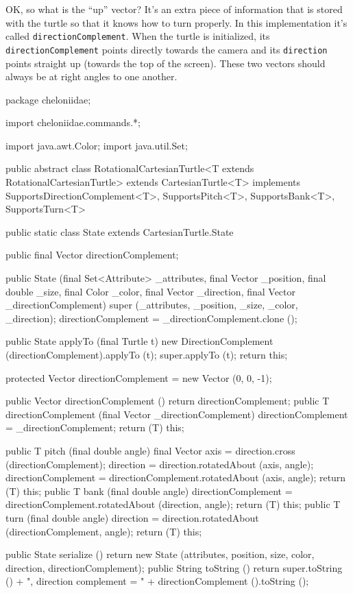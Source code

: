 \documentclass{report}
\begin{document}
      OK, so what is the ``up'' vector? It's an extra piece of information that is stored with the turtle so that it knows how to turn properly. In this
      implementation it's called {\tt directionComplement}. When the turtle is initialized, its {\tt directionComplement} points directly towards the camera and
      its {\tt direction} points straight up (towards the top of the screen). These two vectors should always be at right angles to one another.

\begin{javacode}
package cheloniidae;

import cheloniidae.commands.*;

import java.awt.Color;
import java.util.Set;

public abstract class RotationalCartesianTurtle<T extends RotationalCartesianTurtle> extends CartesianTurtle<T>
implements SupportsDirectionComplement<T>, SupportsPitch<T>, SupportsBank<T>, SupportsTurn<T> {

  public static class State extends CartesianTurtle.State {
    public final Vector directionComplement;

    public State (final Set<Attribute> _attributes, final Vector _position, final double _size, final Color _color,
                  final Vector _direction, final Vector _directionComplement) {
      super (_attributes, _position, _size, _color, _direction);
      directionComplement = _directionComplement.clone ();
    }

    public State applyTo (final Turtle t) {
      new DirectionComplement (directionComplement).applyTo (t);
      super.applyTo (t);
      return this;
    }
  }

  protected Vector directionComplement = new Vector (0, 0, -1);

  public Vector directionComplement ()                                  {return directionComplement;}
  public T      directionComplement (final Vector _directionComplement) {directionComplement = _directionComplement;
                                                                         return (T) this;}

  public T pitch (final double angle) {final Vector axis   = direction.cross (directionComplement);
                                       direction           = direction.rotatedAbout           (axis, angle);
                                       directionComplement = directionComplement.rotatedAbout (axis, angle);
                                       return (T) this;}
  public T bank (final double angle)
    {directionComplement = directionComplement.rotatedAbout (direction, angle); return (T) this;}
  public T turn (final double angle)
    {direction = direction.rotatedAbout (directionComplement, angle);           return (T) this;}

  public State serialize () {return new State (attributes, position, size, color, direction, directionComplement);}
  public String toString () {return super.toString () + ", direction complement = " +
                                    directionComplement ().toString ();}
}
\end{javacode}
\end{document}
